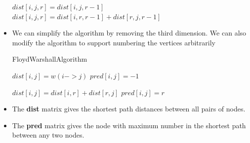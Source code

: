 \documentclass[12pt,letterpaper,titlepage,en-US]{article}
\begin{document}
\begin{itemize}
\begin{algorithm}[H]
\begin{algorithmic}[1]
                \State $dist[i,j,r]=dist[i,j,r-1]$
            \Else{} 
                \State $dist[i,j,r]=dist[i,r,r-1]+dist[r,j,r-1]$
               \EndIf
        \EndFor
        \EndFor
        \EndFor
     
      
        \EndProcedure
    \end{algorithmic}
    \end{algorithm}



\item  We can simplify the algorithm by removing the third dimension. We can also modify the algorithm to support numbering the vertices arbitrarily
\begin{algorithm}[H]
    \caption{FloydWarshallAlgorithm}
    \begin{algorithmic}[1]
      
        \State $dist[i,j]=w( i-> j)$
        \State $pred[i,j]=-1$
        \EndFor
        \EndFor
        
         
        
                \State $dist[i,j]=dist[i,r]+dist[r,j]$
          	\State $pred[i,j]=r$
               \EndIf
        \EndFor
        \EndFor
        \EndFor
     
      
        \EndProcedure
    \end{algorithmic}
    \end{algorithm}


\item The \textbf{dist} matrix gives the shortest path distances between all pairs of nodes.
\item 
The \textbf{pred} matrix gives the node with maximum number in the shortest path between any two nodes.
\end{itemize}
\end{document}
